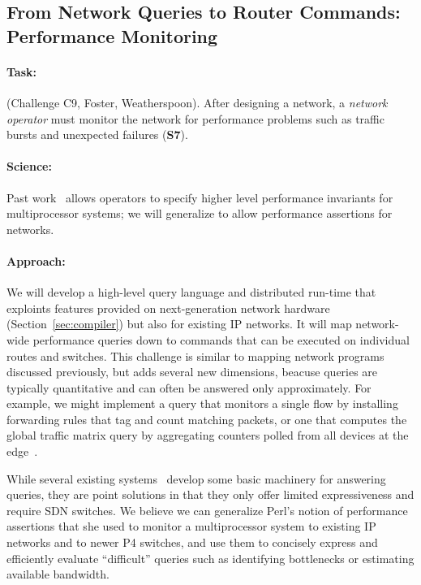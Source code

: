 \subsection{From Network Queries to Router Commands: Performance Monitoring}

\paragraph*{Task:} (Challenge C9, Foster, Weatherspoon). After designing a network, a {\em network operator} must monitor the network for performance problems such as traffic bursts and unexpected failures ({\bf S7}).

\paragraph*{Science:} Past work~\cite{perl1994performance} allows operators to specify higher level performance invariants for multiprocessor systems; we will generalize to allow performance assertions for networks.

\paragraph*{Approach:} We will develop a high-level query language and distributed run-time that exploints features provided on next-generation network hardware (Section~\ref{sec:compiler}) but also for existing IP networks. It will map network-wide performance queries down to commands that can be executed on individual routes and switches. This challenge is similar to mapping network programs discussed previously, but adds several new dimensions, beacuse queries are typically quantitative and can often be answered only approximately. For example, we might implement a query that monitors a single flow by installing  forwarding rules that tag and count matching packets, or one that computes the global traffic matrix query by aggregating counters polled from all devices at the edge~\cite{srinivasan}.

While several existing systems~\cite{srinivasan,ndb,netsight} develop some basic machinery for answering queries, they are point solutions in that they only offer limited expressiveness and require SDN switches.  We believe we can generalize Perl's notion of performance assertions that she used  to monitor a multiprocessor system\cite{perl1994performance}  to existing IP networks and to newer P4 switches, and use them to  concisely express and efficiently evaluate ``difficult'' queries such as identifying bottlenecks or estimating available bandwidth.

